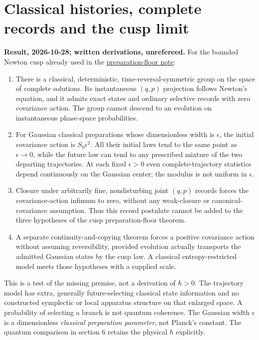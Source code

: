 \documentclass[11pt,a4paper]{article}
\newcommand{\tightlist}{\setlength{\itemsep}{0pt}\setlength{\parskip}{0pt}}
\begin{document}
\hypertarget{classical-histories-complete-records-and-the-cusp-limit}{%
\section{Classical histories, complete records and the cusp
limit}\label{classical-histories-complete-records-and-the-cusp-limit}}

\textbf{Result, 2026-10-28; written derivations, unrefereed.} For the
bounded Newton cusp already used in the
\href{newton-cusp-preparation-floor.md}{preparation-floor note}:

\begin{enumerate}
\def\labelenumi{\arabic{enumi}.}
\tightlist
\item
  There is a classical, deterministic, time-reversal-symmetric group on
  the space of complete solutions. Its instantaneous \((q,p)\)
  projection follows Newton's equation, and it admits exact states and
  ordinary selective records with zero covariance action. The group
  cannot descend to an evolution on instantaneous phase-space
  probabilities.
\item
  For Gaussian classical preparations whose dimensionless width is
  \(\epsilon\), the initial covariance action is \(S_0\epsilon^2\). All
  their initial laws tend to the same point as \(\epsilon\to0\), while
  the future law can tend to any prescribed mixture of the two departing
  trajectories. At each fixed \(\epsilon>0\) even complete-trajectory
  statistics depend continuously on the Gaussian center; the modulus is
  not uniform in \(\epsilon\).
\item
  Closure under arbitrarily fine, nondisturbing joint \((q,p)\) records
  forces the covariance-action infimum to zero, without any weak-closure
  or canonical-covariance assumption. Thus this record postulate cannot
  be added to the three hypotheses of the cusp preparation-floor
  theorem.
\item
  A separate continuity-and-copying theorem forces a positive covariance
  action without assuming reversibility, provided evolution actually
  transports the admitted Gaussian states by the cusp law. A classical
  entropy-restricted model meets those hypotheses with a supplied scale.
\end{enumerate}

This is a test of the missing premise, not a derivation of \(\hbar>0\).
The trajectory model has extra, generally future-selecting classical
state information and no constructed symplectic or local apparatus
structure on that enlarged space. A probability of selecting a branch is
not quantum coherence. The Gaussian width \(\epsilon\) is a
dimensionless \emph{classical preparation parameter}, not Planck's
constant. The quantum comparison in section 6 retains the physical
\(\hbar\) explicitly.
\end{document}
